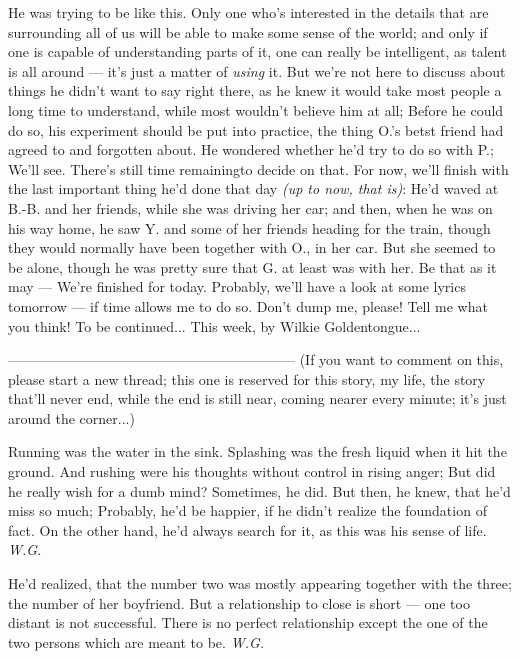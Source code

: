 He was trying to be like this. 
Only one who's interested in the details that are surrounding all of us will be able to make some sense of the world; and only if one is capable of understanding parts of it, one can really be intelligent, as talent is all around --- it's just a matter of \emph{using} it. 
But we're not here to discuss about things he didn't want to say right there, as he knew it would take most people a long time to understand, while most wouldn't believe him at all; Before he could do so, his experiment should be put into practice, the thing O.'s betst friend had agreed to and forgotten about. He wondered whether he'd try to do so with P.; We'll see. 
There's still time remainingto decide on that. 
For now, we'll finish with the last important thing he'd done that day \emph{(up to now, that is)}: He'd waved at B.-B. and her friends, while she was driving her car; and then, when he was on his way home, he saw Y. and some of her friends heading for the train, though they would normally have been together with O., in her car. But she seemed to be alone, though he was pretty sure that G. at least was with her. 
Be that as it may --- 
We're finished for today. 
Probably, we'll have a look at some lyrics tomorrow --- if time allows me to do so. 
Don't dump me, please!
Tell me what you think!
To be continued...
This week, by Wilkie Goldentongue...

--------------------------------------------------------------
(If you want to comment on this, please start a new thread; this one is reserved for this story, my life, the story that'll never end, while the end is still near, coming nearer every minute; it's just around the corner...)

Running 
was the water 
in the sink. 
Splashing 
was the fresh liquid 
when it hit the ground. 
And rushing were his thoughts 
without control 
in rising anger; 
But did he really wish 
for a dumb mind? 
Sometimes, he did. 
But then, he knew, 
that he'd miss so much; 
Probably, he'd be happier, 
if he didn't realize 
the foundation of fact. 
On the other hand, 
he'd always search for it, 
as this was his sense of life. 
\emph{W.G.}

He'd realized, 
that the number two 
was mostly appearing together 
with the three; 
the number of her boyfriend. 
But a relationship to close 
is short --- 
one too distant 
is not successful. 
There is no perfect relationship 
except the one 
of the two 
persons 
which are meant to be. 
\emph{W.G.}
